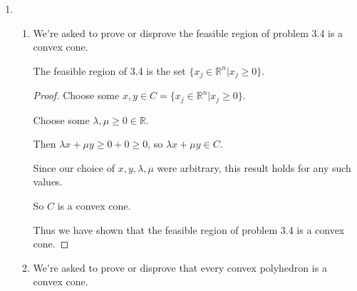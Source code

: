 \documentclass[12pt,letterpaper]{article}
\begin{document}
\begin{enumerate}
\begin{proof}
        Assume $x_j = 0$ is not optimal for all $j$.
        Then we should be able to increase some $x_j$ and arrive at an optimal solution.

        From the constraints, we see that there must exist some $a_{ij} \leq 0$, for each $i$.
        Otherwise $\sum\limits_{j = 1}^n a_{ij}x_j \leq 0$ would fail to hold for all $i$.

        If we choose an arbitrary $a_{kl} \leq 0$ and its corresponding $x_l$,
        then we can increase $x_l$ while still keeping the constraint valid.

        What we find is that, increasing any arbitrary $x_l$ does not invalidate any constraints.
        However, the objective value becomes larger.
        Since we can increase any arbitrary $x_l$ to any amount,
        this problem is unbounded.

        Thus, (with some mental reformulation) we have shown that:

        Given a linear program with all right hand sides equal to 0,
        either $x_j = 0$ is optimal for all $j$, or the problem is unbounded.
      \end{proof}
    \item
      \begin{enumerate}
        \item
          We're asked to prove or disprove the feasible region of problem 3.4 is a convex cone.

          The feasible region of 3.4 is the set $\{x_j \in \mathbb{R}^n | x_j \geq 0\}$.

          \begin{proof}
            Choose some $x, y \in C = \{x_j \in \mathbb{R}^n | x_j \geq 0\}$.

            Choose some $\lambda, \mu \geq 0 \in \mathbb{R}$.

            Then $\lambda x + \mu y \geq 0 + 0 \geq 0$, so $\lambda x + \mu y \in C$.

            Since our choice of $x, y, \lambda, \mu$ were arbitrary,
            this result holds for any such values.

            So $C$ is a convex cone.

            Thus we have shown that the feasible region of problem 3.4 is a convex cone.
          \end{proof}
        \item
          We're asked to prove or disprove that every convex polyhedron is a convex cone.


\end{enumerate}
\end{enumerate}
\end{document}
